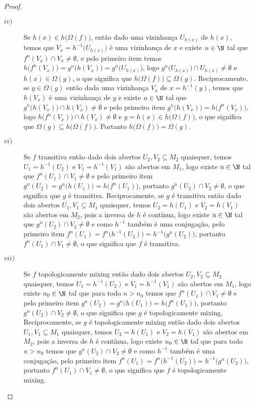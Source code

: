 \begin{proof}
\begin{description}
\item[$iv)$] Se $h(x)\in h\big(\Omega(f)\big)$, então dado uma vizinhança $U_{h(x)}$ de $h(x)$, temos que $V_x=h^{-1}\big(U_{h(x)}\big)$ é uma vizinhança de $x$ e existe $n\in\N$ tal que $f^n(V_x)\cap V_x\neq\emptyset$, e pelo primeiro item temos $h\big(f^n(V_x)\big)=g^n\big(h(V_x)\big)=g^n\big(U_{h(x)}\big)$, logo $g^n\big(U_{h(x)}\big)\cap U_{h(x)}\neq\emptyset$ e $h(x)\in\Omega(g)$, o que significa que $h\big(\Omega(f)\big)\subseteq\Omega(g)$. Reciprocamente, se $y\in\Omega(g)$ então dada uma vizinhança $V_x$ de $x=h^{-1}(y)$, temos que $h(V_x)$ é uma vizinhança de $y$ e existe $n\in\N$ tal que $g^{n}\big(h(V_x)\big)\cap h(V_x)\neq\emptyset$ e pelo primeiro item $g^{n}\big(h(V_x)\big)=h\big(f^n(V_x)\big)$, logo $h\big(f^n(V_x)\big)\cap h(V_x)\neq\emptyset$ e $y=h(x)\in h\big(\Omega(f)\big)$, o que significa que $\Omega(g)\subseteq h\big(\Omega(f)\big)$. Portanto $h\big(\Omega(f)\big)=\Omega(g)$.


\item[$vi)$] Se $f$ transitiva então dado dois abertos $U_2,V_2\subseteq M_2$ quaisquer, temos $U_1=h^{-1}(U_2)$ e $V_1=h^{-1}(V_1)$ são abertos em $M_1$, logo existe $n\in\N$ tal que $f^n(U_1)\cap V_1\neq\emptyset$ e pelo primeiro item $g^n(U_2)=g^n\big(h(U_1)\big)=h\big(f^n(U_1)\big)$, portanto $g^{n}(U_2)\cap V_2\neq\emptyset$, o que significa que $g$ é transitiva. Reciprocamente, se $g$ é transitiva então dado dois abertos $U_1,V_1\subseteq M_1$ quaisquer, temos $U_2=h(U_1)$ e $V_2=h(V_1)$ são abertos em $M_2$, pois a inversa de $h$ é contínua, logo existe $n\in\N$ tal que $g^n(U_2)\cap V_2\neq\emptyset$ e como $h^{-1}$ também é uma conjugação, pelo primeiro item $f^n(U_1)=f^n\big(h^{-1}(U_2)\big)=h^{-1}\big(g^n(U_2)\big)$, portanto $f^{n}(U_1)\cap V_1\neq\emptyset$, o que significa que $f$ é transitiva.

\item[$vii)$] Se $f$ topologicamente mixing então dado dois abertos $U_2,V_2\subseteq M_2$ quaisquer, temos $U_1=h^{-1}(U_2)$ e $V_1=h^{-1}(V_1)$ são abertos em $M_1$, logo existe $n_0\in\N$ tal que para todo $n>n_0$ temos que $f^n(U_1)\cap V_1\neq\emptyset$ e pelo primeiro item $g^n(U_2)=g^n\big(h(U_1)\big)=h\big(f^n(U_1)\big)$, portanto $g^{n}(U_2)\cap V_2\neq\emptyset$, o que significa que $g$ é topologicamente mixing. Reciprocamente, se $g$ é topologicamente mixing então dado dois abertos $U_1,V_1\subseteq M_1$ quaisquer, temos $U_2=h(U_1)$ e $V_2=h(V_1)$ são abertos em $M_2$, pois a inversa de $h$ é contínua, logo existe $n_0\in\N$ tal que para todo $n>n_0$ temos que $g^n(U_2)\cap V_2\neq\emptyset$ e como $h^{-1}$ também é uma conjugação, pelo primeiro item $f^n(U_1)=f^n\big(h^{-1}(U_2)\big)=h^{-1}\big(g^n(U_2)\big)$, portanto $f^{n}(U_1)\cap V_1\neq\emptyset$, o que significa que $f$ é topologicamente mixing.
\end{description}
\end{proof}

